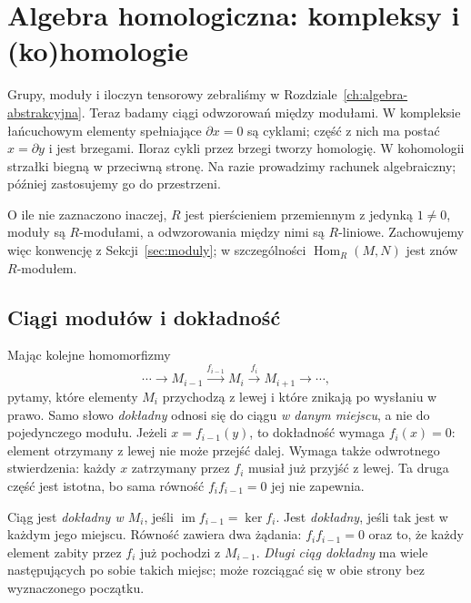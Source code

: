 \chapter{Algebra homologiczna: kompleksy i (ko)homologie}
\label{ch:algebra-homologiczna}

Grupy, moduły i iloczyn tensorowy zebraliśmy w
Rozdziale~\ref{ch:algebra-abstrakcyjna}.
Teraz badamy ciągi odwzorowań między modułami.
W kompleksie łańcuchowym elementy spełniające
$\partial x=0$ są cyklami; część z nich ma postać
$x=\partial y$ i jest brzegami. Iloraz cykli
przez brzegi tworzy homologię. W kohomologii
strzałki biegną w przeciwną stronę.
Na razie prowadzimy rachunek algebraiczny;
później zastosujemy go do przestrzeni.

O ile nie zaznaczono inaczej, $R$ jest pierścieniem przemiennym
z jedynką $1\ne0$, moduły są $R$-modułami, a odwzorowania między
nimi są $R$-liniowe. Zachowujemy więc konwencję z
Sekcji~\ref{sec:moduly}; w szczególności
$\operatorname{Hom}_R(M,N)$ jest znów $R$-modułem.

\section{Ciągi modułów i dokładność}
\label{sec:dokladnosc-modulow}

Mając kolejne homomorfizmy
\[
 \cdots\longrightarrow M_{i-1}
 \xrightarrow{f_{i-1}}M_i
 \xrightarrow{f_i}M_{i+1}
 \longrightarrow\cdots,
\]
pytamy, które elementy $M_i$ przychodzą z lewej
i które znikają po wysłaniu w prawo.
Samo słowo \emph{dokładny} odnosi się do
ciągu \emph{w danym miejscu}, a nie do
pojedynczego modułu.
Jeżeli $x=f_{i-1}(y)$, to dokładność wymaga
$f_i(x)=0$: element otrzymany z lewej nie może
przejść dalej. Wymaga także odwrotnego stwierdzenia:
każdy $x$ zatrzymany przez $f_i$ musiał już
przyjść z lewej. Ta druga część jest istotna,
bo sama równość $f_i f_{i-1}=0$ jej nie zapewnia.

\begin{definicja}
\label{def:ciag-dokladny}
Ciąg jest \emph{dokładny w $M_i$}, jeśli
$\operatorname{im}f_{i-1}=\ker f_i$.
Jest \emph{dokładny}, jeśli tak jest
w każdym jego miejscu. Równość zawiera
dwa żądania: $f_i f_{i-1}=0$ oraz to,
że każdy element zabity przez $f_i$
już pochodzi z $M_{i-1}$.
\emph{Długi ciąg dokładny} ma wiele
następujących po sobie takich miejsc;
może rozciągać się w obie strony
bez wyznaczonego początku.
\end{definicja}

